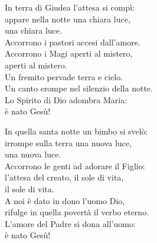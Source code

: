 
\strofa In terra di Giudea l'attesa si compì:\\
appare nella notte una chiara luce,\\
una chiara luce.\\
Accorrono i pastori accesi dall'amore.\\
Accorrono i Magi aperti al mistero,\\
aperti al mistero.\\
Un fremito pervade terra e cielo.\\
Un canto erompe nel silenzio della notte.\\
Lo Spirito di Dio adombra Maria:\\
è nato Gesù!

\spazio


\spazio

\strofa In quella santa notte un bimbo si svelò:\\
irrompe sulla terra una nuova luce,\\
una nuova luce.\\
Accorrono le genti ad adorare il Figlio:\\
l'attesa del creato, il sole di vita,\\
il sole di vita.\\
A noi è dato in dono l'uomo Dio,\\
rifulge in quella povertà il verbo eterno.\\
L'amore del Padre si dona all'uomo:\\
è nato Gesù!

\spazio

